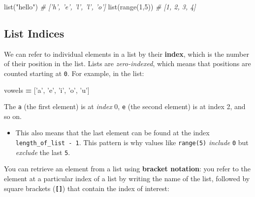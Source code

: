 \documentclass[]{book}
\newenvironment{Shaded}{\begin{snugshade}}{\end{snugshade}}
\newcommand{\DecValTok}[1]{\textcolor[rgb]{0.00,0.00,0.81}{#1}}
\newcommand{\StringTok}[1]{\textcolor[rgb]{0.31,0.60,0.02}{#1}}
\newcommand{\CommentTok}[1]{\textcolor[rgb]{0.56,0.35,0.01}{\textit{#1}}}
\newcommand{\OperatorTok}[1]{\textcolor[rgb]{0.81,0.36,0.00}{\textbf{#1}}}
\newcommand{\BuiltInTok}[1]{#1}
\newcommand{\NormalTok}[1]{#1}
\providecommand{\tightlist}{%
  \setlength{\itemsep}{0pt}\setlength{\parskip}{0pt}}
\begin{document}
\begin{Shaded}
\begin{Highlighting}[]
\BuiltInTok{list}\NormalTok{(}\StringTok{"hello"}\NormalTok{)  }\CommentTok{# ['h', 'e', 'l', 'l', 'o']}
\BuiltInTok{list}\NormalTok{(}\BuiltInTok{range}\NormalTok{(}\DecValTok{1}\NormalTok{,}\DecValTok{5}\NormalTok{))  }\CommentTok{# [1, 2, 3, 4]}
\end{Highlighting}
\end{Shaded}

\hypertarget{list-indices}{\subsection{List
Indices}\label{list-indices}}

We can refer to individual elements in a list by their \textbf{index},
which is the number of their position in the list. Lists are
\emph{zero-indexed}, which means that positions are counted starting at
\texttt{0}. For example, in the list:

\begin{Shaded}
\begin{Highlighting}[]
\NormalTok{vowels }\OperatorTok{=}\NormalTok{ [}\StringTok{'a'}\NormalTok{, }\StringTok{'e'}\NormalTok{, }\StringTok{'i'}\NormalTok{, }\StringTok{'o'}\NormalTok{, }\StringTok{'u'}\NormalTok{]}
\end{Highlighting}
\end{Shaded}

The \texttt{\textquotesingle{}a\textquotesingle{}} (the first element)
is at \emph{index} 0, \texttt{\textquotesingle{}e\textquotesingle{}}
(the second element) is at index 2, and so on.

\begin{itemize}
\tightlist
\item
  This also means that the last element can be found at the index
  \texttt{length\_of\_list\ -\ 1}. This pattern is why values like
  \texttt{range(5)} \emph{include} \texttt{0} but \emph{exclude} the
  last \texttt{5}.
\end{itemize}

You can retrieve an element from a list using \textbf{bracket notation}:
you refer to the element at a particular index of a list by writing the
name of the list, followed by square brackets (\textbf{\texttt{{[}{]}}})
that contain the index of interest:
\end{document}
